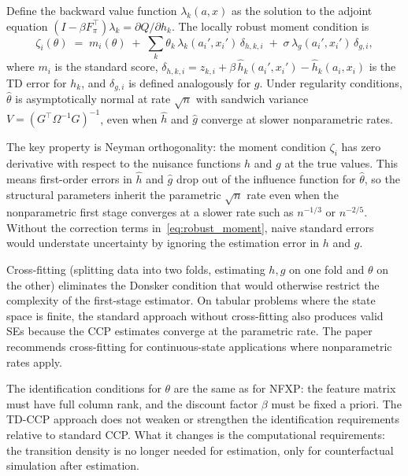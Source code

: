 \documentclass[11pt]{article}
\begin{document}
\begin{proposition}
Define the backward value function $\lambda_k(a,x)$ as the solution to the adjoint equation $(I - \beta F_\pi^\top)\lambda_k = \partial Q / \partial h_k$.
The locally robust moment condition is
\begin{equation}
\label{eq:robust_moment}
\zeta_i(\theta) \;=\; m_i(\theta) \;+\; \sum_k \theta_k\,\lambda_k(a_i', x_i')\,\delta_{h,k,i} \;+\; \sigma\,\lambda_g(a_i', x_i')\,\delta_{g,i},
\end{equation}
where $m_i$ is the standard score, $\delta_{h,k,i} = z_{k,i} + \beta\,\hat h_k(a_i', x_i') - \hat h_k(a_i, x_i)$ is the TD error for $h_k$, and $\delta_{g,i}$ is defined analogously for $g$.
Under regularity conditions, $\hat\theta$ is asymptotically normal at rate $\sqrt{n}$ with sandwich variance $V = (G^\top \Omega^{-1} G)^{-1}$, even when $\hat h$ and $\hat g$ converge at slower nonparametric rates.
\end{proposition}

The key property is Neyman orthogonality: the moment condition $\zeta_i$ has zero derivative with respect to the nuisance functions $h$ and $g$ at the true values.
This means first-order errors in $\hat h$ and $\hat g$ drop out of the influence function for $\hat\theta$, so the structural parameters inherit the parametric $\sqrt{n}$ rate even when the nonparametric first stage converges at a slower rate such as $n^{-1/3}$ or $n^{-2/5}$.
Without the correction terms in~\eqref{eq:robust_moment}, naive standard errors would understate uncertainty by ignoring the estimation error in $h$ and $g$.

Cross-fitting (splitting data into two folds, estimating $h,g$ on one fold and $\theta$ on the other) eliminates the Donsker condition that would otherwise restrict the complexity of the first-stage estimator.
On tabular problems where the state space is finite, the standard approach without cross-fitting also produces valid SEs because the CCP estimates converge at the parametric rate.
The paper recommends cross-fitting for continuous-state applications where nonparametric rates apply.

The identification conditions for $\theta$ are the same as for NFXP: the feature matrix must have full column rank, and the discount factor $\beta$ must be fixed a priori.
The TD-CCP approach does not weaken or strengthen the identification requirements relative to standard CCP.
What it changes is the computational requirements: the transition density is no longer needed for estimation, only for counterfactual simulation after estimation.
\end{document}
